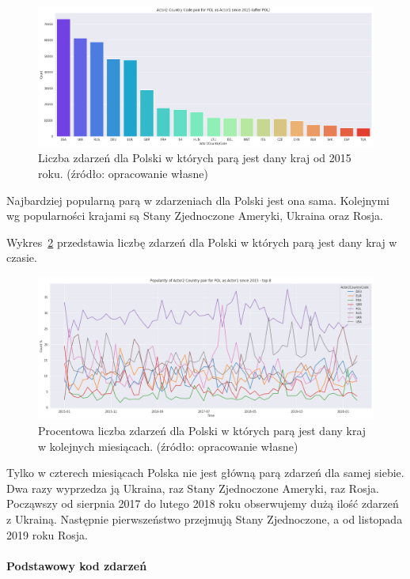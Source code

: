 \documentclass[11pt]{report}
\begin{document}
    \begin{figure}[!htp]
        \centering
        \includegraphics[width=\linewidth]{fig/PL/PLactor2Pair.png}
        \caption{Liczba zdarzeń dla Polski w których parą jest dany kraj od 2015 roku. (źródło: opracowanie własne)}
        \label{fig:PLpair}
    \end{figure}
    Najbardziej popularną parą w zdarzeniach dla Polski jest ona sama.
    Kolejnymi wg popularności krajami są Stany Zjednoczone Ameryki, Ukraina oraz Rosja.

    Wykres~\ref{fig:PLpairPerc} przedstawia liczbę zdarzeń dla Polski w których parą jest dany kraj w czasie.
    \begin{figure}[!htp]
        \centering
        \includegraphics[width=\linewidth]{fig/PL/PLactor2PairPercinTIME.png}
        \caption{Procentowa liczba zdarzeń dla Polski w których parą jest dany kraj w kolejnych miesiącach. (źródło: opracowanie własne)}
        \label{fig:PLpairPerc}
    \end{figure}
    Tylko w czterech miesiącach Polska nie jest główną parą zdarzeń dla samej siebie.
    Dwa razy wyprzedza ją Ukraina, raz Stany Zjednoczone Ameryki, raz Rosja.
    Począwszy od sierpnia 2017 do lutego 2018 roku obserwujemy dużą ilość zdarzeń z Ukrainą.
    Następnie pierwszeństwo przejmują Stany Zjednoczone, a od listopada 2019 roku Rosja.

    \paragraph{Podstawowy kod zdarzeń}
\end{document}
